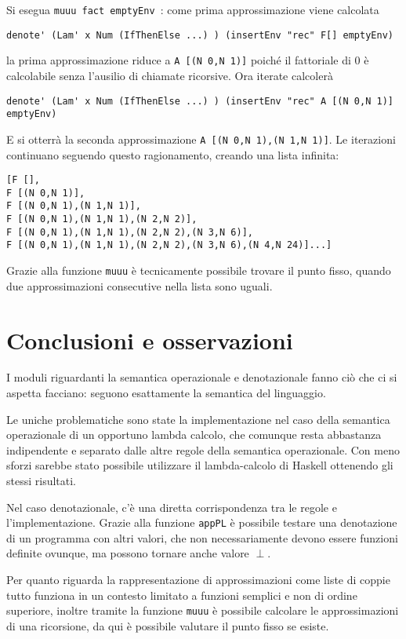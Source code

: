 \documentclass{article}
\begin{document}
Si esegua \texttt{muuu fact emptyEnv }:
come prima approssimazione viene calcolata 
\begin{verbatim}
denote' (Lam' x Num (IfThenElse ...) ) (insertEnv "rec" F[] emptyEnv)
\end{verbatim}
la prima approssimazione riduce a \texttt{A [(N 0,N 1)]} poiché il fattoriale di 0 è calcolabile senza l'ausilio di chiamate ricorsive.
Ora iterate calcolerà
\begin{verbatim}
denote' (Lam' x Num (IfThenElse ...) ) (insertEnv "rec" A [(N 0,N 1)] emptyEnv)
\end{verbatim}
E si otterrà la seconda approssimazione \texttt{A [(N 0,N 1),(N 1,N 1)]}.
Le iterazioni continuano seguendo questo ragionamento, creando una lista infinita:

\begin{verbatim}
[F [],
F [(N 0,N 1)],
F [(N 0,N 1),(N 1,N 1)],
F [(N 0,N 1),(N 1,N 1),(N 2,N 2)],
F [(N 0,N 1),(N 1,N 1),(N 2,N 2),(N 3,N 6)],
F [(N 0,N 1),(N 1,N 1),(N 2,N 2),(N 3,N 6),(N 4,N 24)]...]
\end{verbatim}

Grazie alla funzione \texttt{muuu} è tecnicamente possibile trovare il punto fisso, quando due approssimazioni consecutive nella lista sono uguali.

\section{Conclusioni e osservazioni}

I moduli riguardanti la semantica operazionale e denotazionale fanno ciò che ci si aspetta facciano: seguono esattamente la semantica del linguaggio.

Le uniche problematiche sono state la implementazione nel caso della semantica operazionale di un opportuno lambda calcolo, che comunque resta abbastanza indipendente e separato dalle altre regole della semantica operazionale. Con meno sforzi sarebbe stato possibile utilizzare il lambda-calcolo di Haskell ottenendo gli stessi risultati.

Nel caso denotazionale, c'è una diretta corrispondenza tra le regole e l'implementazione.
Grazie alla funzione \texttt{appPL} è possibile testare una denotazione di un programma con altri valori, che non necessariamente devono essere funzioni definite ovunque, ma possono tornare anche valore $\perp$.

Per quanto riguarda la rappresentazione di approssimazioni come liste di coppie tutto funziona in un contesto limitato a funzioni semplici e non di ordine superiore, inoltre tramite la funzione \texttt{muuu} è possibile calcolare le approssimazioni di una ricorsione, da qui è possibile valutare il punto fisso se esiste.
\end{document}
